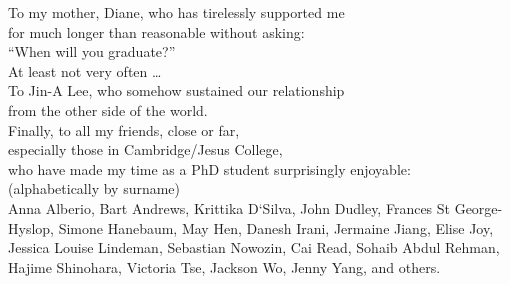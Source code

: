 \documentclass[thesis]{subfiles}
\begin{document}

\begin{dedication}
To my mother, Diane, who has tirelessly supported me\\
for much longer than reasonable without asking:\\
``When will you graduate?''\\
At least not very often \ldots\\
\vspace{0.33\textheight minus 10ex}
To Jin-A Lee, who somehow sustained our relationship\\
from the other side of the world.\\
\vspace{0.11\textheight minus 10ex}
Finally, to all my friends, close or far,\\
especially those in Cambridge/Jesus College,\\
who have made my time as a PhD student surprisingly enjoyable:\\
\vspace{1em}
{\small(alphabetically by surname)}\\
\vspace{0.5em}
Anna Alberio,
Bart Andrews,
Krittika D`Silva,
John Dudley,
Frances St George-Hyslop,
Simone Hanebaum,
May Hen,
Danesh Irani,
Jermaine Jiang,
Elise Joy,
Jessica Louise Lindeman,
Sebastian Nowozin,
Cai Read,
Sohaib Abdul Rehman,
Hajime Shinohara,
Victoria Tse,
Jackson Wo,
Jenny Yang,
and others.
\end{dedication}
\end{document}
